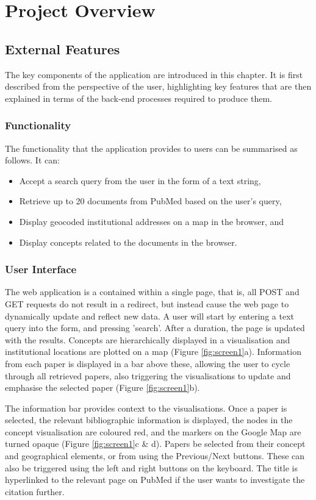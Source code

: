 \documentclass[Report.tex]{subfiles}
\begin{document}
\chapter{Project Overview}
\section{External Features}
The key components of the application are introduced in this chapter. It is first described from the perspective of the user, highlighting key features that are then explained in terms of the back-end processes required to produce them.

\subsection{Functionality}
The functionality that the application provides to users can be summarised as follows. It can:
\begin{itemize}
\item Accept a search query from the user in the form of a text string,
\item Retrieve up to 20 documents from PubMed based on the user's query,
\item Display geocoded institutional addresses on a map in the browser, and
\item Display concepts related to the documents in the browser.
\end{itemize}

\subsection{User Interface}
The web application is a contained within a single page, that is, all POST and GET requests do not result in a redirect, but instead cause the web page to dynamically update and reflect new data. A user will start by entering a text query into the form, and pressing 'search'. After a duration, the page is updated with the results. Concepts are hierarchically displayed in a visualisation and institutional locations are plotted on a map (Figure \ref{fig:screen1}a). Information from each paper is displayed in a bar above these, allowing the user to cycle through all retrieved papers, also triggering the visualisations to update and emphasise the selected paper (Figure \ref{fig:screen1}b).\newline

\noindent The information bar provides context to the visualisations. Once a paper is selected, the relevant bibliographic information is displayed, the nodes in the concept visualisation are coloured red, and the markers on the Google Map are turned opaque (Figure \ref{fig:screen1}c \& d). Papers be selected from their concept and geographical elements, or from using the Previous/Next buttons. These can also be triggered using the left and right buttons on the keyboard. The title is hyperlinked to the relevant page on PubMed if the user wants to investigate the citation further. 
\end{document}
